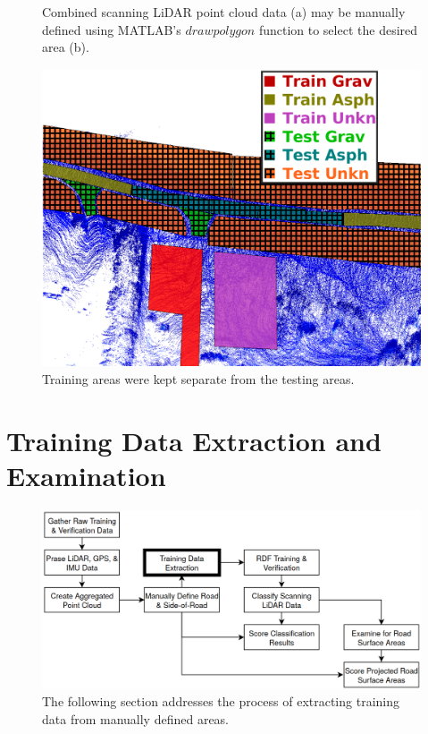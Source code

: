 \documentclass[numbered,pdftex]{ohio-etd}
\begin{document}
{{\begin{figure}[H]
\begin{subfigure}{0.45\textwidth}
				\caption[Selected Road area on Point Cloud]{}
				\label{fig:area_selected_in_results}
			\end{subfigure}
			\caption[Manual Area Selection Process]{Combined scanning LiDAR point cloud data (a) may be manually defined using MATLAB's $drawpolygon$ function to select the desired area (b). }
			\label{fig:Area_Selection_Process_in_results}
		\end{figure}
		
		\begin{figure}[H]
			\centering
			\includegraphics[width=0.95\linewidth]{Defense_Images/test_vs_train_areas_hatch}
			\caption[Training vs Testing Areas]{Training areas were kept separate from the testing areas.}
			\label{fig:test_vs_train_areas_in_results}
		\end{figure}
		
		
		
	}
	
	

	\section{Training Data Extraction and Examination}\label{sec:training_data_extraction}{
		
		\begin{figure}[H]
			\centering
			\includegraphics[width=0.9\linewidth]{Defense_Images/flowz_train_data_extract}
			\caption[Training Data Extraction Flowchart Context]{The following section addresses the process of extracting training data from manually defined areas.}
			\label{fig:flowz_train_data_extract}
		\end{figure}
		
}}
\end{document}

